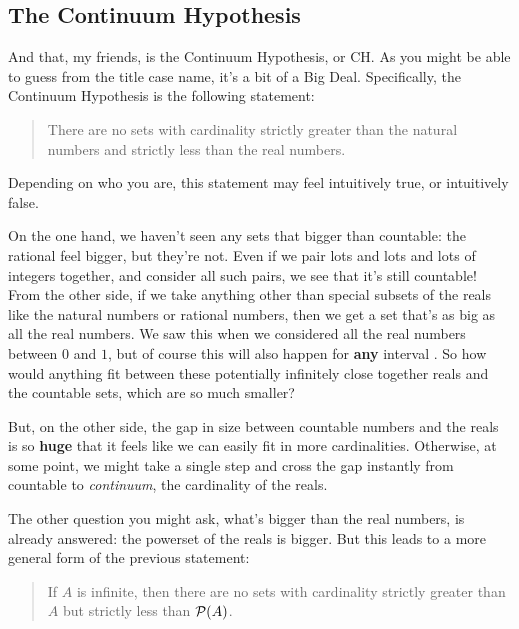 \subsection{The Continuum Hypothesis}

And that, my friends, is the Continuum Hypothesis, or CH.
As you might be able to guess from the title case name, it's a bit of a Big Deal.
Specifically, the Continuum Hypothesis is the following statement:

\begin{quote}
    There are no sets with cardinality strictly greater than the natural numbers and strictly less than the real numbers.
\end{quote}

Depending on who you are, this statement may feel intuitively true, or intuitively false.

On the one hand, we haven't seen any sets that bigger than countable: the rational feel bigger, but they're not.
Even if we pair lots and lots and lots of integers together, and consider all such pairs, we see that it's still countable!
From the other side, if we take anything other than special subsets of the reals like the natural numbers or rational numbers, then we get a set that's as big as all the real numbers.
We saw this when we considered all the real numbers between $0$ and $1$, but of course this will also happen for \textbf{any} interval .
So how would anything fit between these potentially infinitely close together reals and the countable sets, which are so much smaller?

But, on the other side, the gap in size between countable numbers and the reals is so \textbf{huge} that it feels like we can easily fit in more cardinalities.
Otherwise, at some point, we might take a single step and cross the gap instantly from countable to \emph{continuum}, the cardinality of the reals.

The other question you might ask, what's bigger than the real numbers, is already answered: the powerset of the reals is bigger.
But this leads to a more general form  of the previous statement:

\begin{quote}
    If $A$ is infinite, then there are no sets with cardinality strictly greater than $A$ but strictly less than $\mathcal{P}{\left( {A} \right)}$.
\end{quote}

